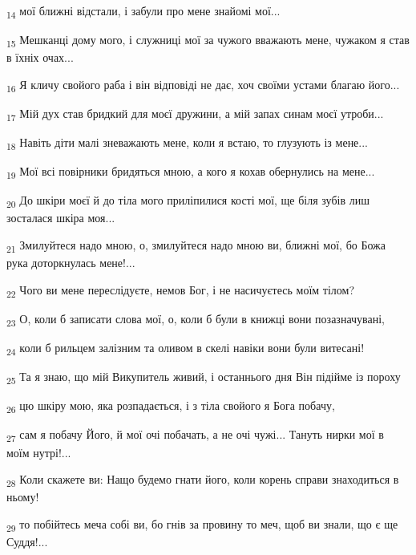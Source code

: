 \begin{tcolorbox}
\textsubscript{14} мої ближні відстали, і забули про мене знайомі мої...
\end{tcolorbox}
\begin{tcolorbox}
\textsubscript{15} Мешканці дому мого, і служниці мої за чужого вважають мене, чужаком я став в їхніх очах...
\end{tcolorbox}
\begin{tcolorbox}
\textsubscript{16} Я кличу свойого раба і він відповіді не дає, хоч своїми устами благаю його...
\end{tcolorbox}
\begin{tcolorbox}
\textsubscript{17} Мій дух став бридкий для моєї дружини, а мій запах синам моєї утроби...
\end{tcolorbox}
\begin{tcolorbox}
\textsubscript{18} Навіть діти малі зневажають мене, коли я встаю, то глузують із мене...
\end{tcolorbox}
\begin{tcolorbox}
\textsubscript{19} Мої всі повірники бридяться мною, а кого я кохав обернулись на мене...
\end{tcolorbox}
\begin{tcolorbox}
\textsubscript{20} До шкіри моєї й до тіла мого приліпилися кості мої, ще біля зубів лиш зосталася шкіра моя...
\end{tcolorbox}
\begin{tcolorbox}
\textsubscript{21} Змилуйтеся надо мною, о, змилуйтеся надо мною ви, ближні мої, бо Божа рука доторкнулась мене!...
\end{tcolorbox}
\begin{tcolorbox}
\textsubscript{22} Чого ви мене переслідуєте, немов Бог, і не насичуєтесь моїм тілом?
\end{tcolorbox}
\begin{tcolorbox}
\textsubscript{23} О, коли б записати слова мої, о, коли б були в книжці вони позазначувані,
\end{tcolorbox}
\begin{tcolorbox}
\textsubscript{24} коли б рильцем залізним та оливом в скелі навіки вони були витесані!
\end{tcolorbox}
\begin{tcolorbox}
\textsubscript{25} Та я знаю, що мій Викупитель живий, і останнього дня Він підійме із пороху
\end{tcolorbox}
\begin{tcolorbox}
\textsubscript{26} цю шкіру мою, яка розпадається, і з тіла свойого я Бога побачу,
\end{tcolorbox}
\begin{tcolorbox}
\textsubscript{27} сам я побачу Його, й мої очі побачать, а не очі чужі... Тануть нирки мої в моїм нутрі!...
\end{tcolorbox}
\begin{tcolorbox}
\textsubscript{28} Коли скажете ви: Нащо будемо гнати його, коли корень справи знаходиться в ньому!
\end{tcolorbox}
\begin{tcolorbox}
\textsubscript{29} то побійтесь меча собі ви, бо гнів за провину то меч, щоб ви знали, що є ще Суддя!...
\end{tcolorbox}
